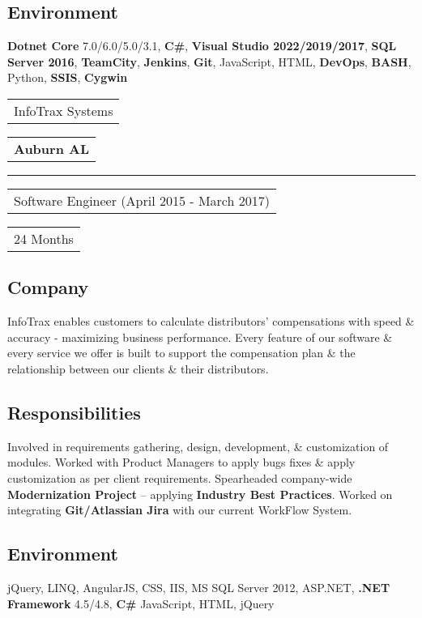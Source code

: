 \documentclass[letterpaper,10pt]{article}
\begin{document}
    \subsection{Environment}
    \textbf{Dotnet Core} 7.0/6.0/5.0/3.1, \textbf{C\#}, \textbf{Visual Studio 2022/2019/2017}, \textbf{SQL Server 2016}, \textbf{TeamCity}, \textbf{Jenkins}, \textbf{Git}, JavaScript, HTML, \textbf{DevOps}, \textbf{BASH}, Python, \textbf{SSIS}, \textbf{Cygwin}



    \vspace{1.27cm}
    \noindent
    \begin{tabular}[t]{@{}l}
    \Large{InfoTrax Systems}
    \end{tabular}
    \hfill
    \begin{tabular}[t]{l@{}}
    \textbf{Auburn AL}
    \end{tabular}
    \noindent\rule{\textwidth}{0.5pt}
    \begin{tabular}[t]{@{}l}
    Software Engineer (April 2015 - March 2017)
    \end{tabular}
    \hfill
    \begin{tabular}[t]{l@{}}
    24 Months
    \end{tabular}

    \subsection{Company}
    InfoTrax enables customers to calculate distributors’ compensations with speed \& accuracy - maximizing business performance. Every feature of our software \& every service we offer is built to support the compensation plan \& the relationship between our clients \& their distributors.

    \subsection{Responsibilities}
    Involved in requirements gathering, design, development, \& customization of modules. Worked with Product Managers to apply bugs fixes \& apply customization as per client requirements. Spearheaded company-wide \textbf{Modernization Project} – applying \textbf{Industry Best Practices}. Worked on integrating \textbf{Git/Atlassian Jira} with our current WorkFlow System.

    \subsection{Environment}
    jQuery, LINQ, AngularJS, CSS, IIS, MS SQL Server 2012, ASP.NET, \textbf{.NET Framework} 4.5/4.8, \textbf{C\#} JavaScript, HTML, jQuery
    \pagebreak
\end{document}
